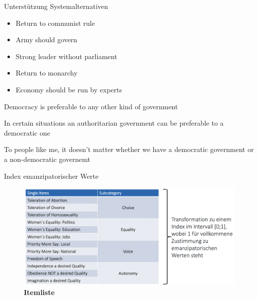 \documentclass[11pt]{beamer}
\begin{document}
\begin{frame}{Unterstützung Systemalternativen}
	\begin{itemize}
		\item Return to communist rule
		\item Army should govern
		\item Strong leader without parliament
		\item Return to monarchy
		\item Economy should be run by experts \parencite[111]{Rose1998}
	\end{itemize}

	\begin{nolist}
		\item Democracy is preferable to any other kind of government
		\item In certain situations an authoritarian government can be preferable to a democratic one
		\item To people like me, it doesn't matter whether we have a democratic government or a non-democratic governemt \parencite[103]{Rose1998}
	\end{nolist}
\end{frame}

\begin{frame}{Index emanzipatorischer Werte \parencite[71]{Welzel2013}}
	\begin{figure}[ht]
		\includegraphics[width=\textwidth]{pics/s11-1.png}
		\caption{\textbf{Itemliste}}
	\end{figure}
\end{frame}
\end{document}
